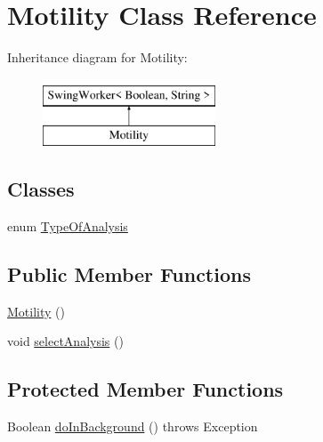 \hypertarget{classanalysis_1_1_motility}{}\section{Motility Class Reference}
\label{classanalysis_1_1_motility}
Inheritance diagram for Motility\+:\begin{figure}[H]
\begin{center}
\leavevmode
\includegraphics[height=2.000000cm]{classanalysis_1_1_motility}
\end{center}
\end{figure}
\subsection*{Classes}
\begin{DoxyCompactItemize}
\item 
enum \hyperlink{enumanalysis_1_1_motility_1_1_type_of_analysis}{Type\+Of\+Analysis}
\end{DoxyCompactItemize}
\subsection*{Public Member Functions}
\begin{DoxyCompactItemize}
\item 
\hyperlink{classanalysis_1_1_motility_a7c749f31bb24070f3cb6e9133160eb34}{Motility} ()
\item 
void \hyperlink{classanalysis_1_1_motility_aef66a58ab7f95817a68a3429550562fc}{select\+Analysis} ()
\end{DoxyCompactItemize}
\subsection*{Protected Member Functions}
\begin{DoxyCompactItemize}
\item 
Boolean \hyperlink{classanalysis_1_1_motility_ab048bf7b5ce8c46bb48b99b8d0999110}{do\+In\+Background} ()  throws Exception 
\end{DoxyCompactItemize}
